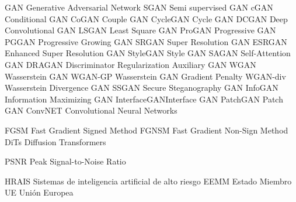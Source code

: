 


            {GAN}         {Generative Adversarial Network}
           {SGAN}        {Semi supervised GAN}
           {cGAN}        {Conditional GAN}
          {CoGAN}       {Couple GAN}
       {CycleGAN}    {Cycle GAN}
          {DCGAN}       {Deep Convolutional GAN}
          {LSGAN}       {Least Square GAN}
         {ProGAN}      {Progressive GAN}
          {PGGAN}       {Progressive Growing GAN}
          {SRGAN}       {Super Resolution GAN}
         {ESRGAN}      {Enhanced Super Resolution GAN}
       {StyleGAN}    {Style GAN}
          {SAGAN}       {Self-Attention GAN}
         {DRAGAN}      {Discriminator Regularization Auxiliary GAN}
           {WGAN}        {Wasserstein GAN}
        {WGAN-GP}     {Wasserstein GAN Gradient Penalty}
       {WGAN-div}    {Wasserstein Divergence GAN}
          {SSGAN}       {Secure Steganography GAN}
        {InfoGAN}     {Information Maximizing GAN}
   {InterfaceGAN}{Interface GAN}
       {PatchGAN}    {Patch GAN}
        {ConvNET}     {Convolutional Neural Networks}

           {FGSM}       {Fast Gradient Signed Method}
          {FGNSM}      {Fast Gradient Non-Sign Method}
           {DiTs}       {Diffusion Transformers}

           {PSNR}       {Peak Signal-to-Noise Ratio}

          {HRAIS}       {Sistemas de inteligencia artificial de alto riesgo}
           {EEMM}        {Estado Miembro}
             {UE}          {Unión Europea}



